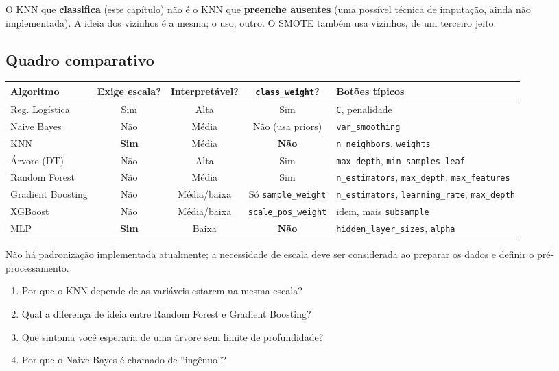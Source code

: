 \documentclass[11pt,a4paper]{article}
\newcommand{\cod}[1]{\texttt{#1}}
\begin{document}
\begin{atencao}
O KNN que \textbf{classifica} (este capítulo) não é o KNN que \textbf{preenche ausentes} (uma possível técnica de imputação, ainda não implementada). A ideia dos vizinhos é a mesma; o uso, outro. O SMOTE também usa vizinhos, de um terceiro jeito.
\end{atencao}

\subsection{Quadro comparativo}

\begin{center}
\small
\renewcommand{\arraystretch}{1.25}
\setlength{\tabcolsep}{4pt}
\begin{tabular}{@{}lcccp{3.9cm}@{}}
\toprule
\textbf{Algoritmo} & \textbf{Exige escala?} & \textbf{Interpretável?} & \textbf{\texttt{class\_weight}?} & \textbf{Botões típicos} \\
\midrule
Reg. Logística & Sim & Alta & Sim & \cod{C}, penalidade \\
Naive Bayes & Não & Média & Não (usa priors) & \cod{var\_smoothing} \\
KNN & \textbf{Sim} & Média & \textbf{Não} & \cod{n\_neighbors}, \cod{weights} \\
Árvore (DT) & Não & Alta & Sim & \cod{max\_depth}, \cod{min\_samples\_leaf} \\
Random Forest & Não & Média & Sim & \cod{n\_estimators}, \cod{max\_depth}, \cod{max\_features} \\
Gradient Boosting & Não & Média/baixa & Só \cod{sample\_weight} & \cod{n\_estimators}, \cod{learning\_rate}, \cod{max\_depth} \\
XGBoost & Não & Média/baixa & \cod{scale\_pos\_weight} & idem, mais \cod{subsample} \\
MLP & \textbf{Sim} & Baixa & \textbf{Não} & \cod{hidden\_layer\_sizes}, \cod{alpha} \\
\bottomrule
\end{tabular}
\end{center}

Não há padronização implementada atualmente; a necessidade de escala deve ser considerada ao preparar os dados e definir o pré-processamento.

\begin{teste}
\begin{enumerate}
  \item Por que o KNN depende de as variáveis estarem na mesma escala?
  \item Qual a diferença de ideia entre Random Forest e Gradient Boosting?
  \item Que sintoma você esperaria de uma árvore sem limite de profundidade?
  \item Por que o Naive Bayes é chamado de ``ingênuo''?
\end{enumerate}
\end{teste}
\end{document}
